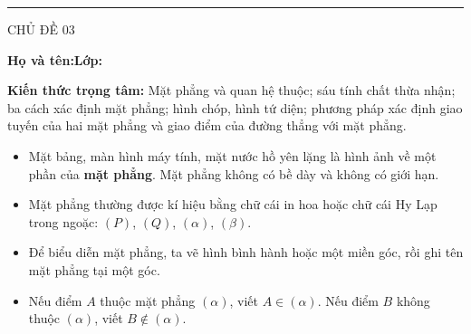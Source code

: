 \documentclass[11pt,a4paper]{article}
\newcommand{\sectitle}[2]{\vspace{4pt}\noindent{\large\bfseries\textcolor{questionpurple}{#1.\ #2}}\par\vspace{3pt}}
\begin{document}
\noindent
\begin{minipage}[t]{.35\linewidth}
 \vspace{2pt}\rule{.73\linewidth}{.4pt}\par\vspace{3pt}
 CHỦ ĐỀ 03\par\vspace{3pt}{\itshape TÀI LIỆU HỌC TẬP -- BÀI 07\par}
\end{minipage}\hfill
\begin{minipage}[t]{.62\linewidth}
 \vspace{4pt}{\small\bfseries VẤN ĐỀ 11X31\par
 CƠ BẢN VỀ HÌNH HỌC KHÔNG GIAN\par}
\end{minipage}

\vspace{4mm}
\noindent\textbf{Họ và tên:}\dotfill\hfill\textbf{Lớp:}\enspace\dotfill
\vspace{2mm}

\begin{theorybox}
\textbf{Kiến thức trọng tâm:} Mặt phẳng và quan hệ thuộc; sáu tính chất thừa nhận;
ba cách xác định mặt phẳng; hình chóp, hình tứ diện; phương pháp xác định
giao tuyến của hai mặt phẳng và giao điểm của đường thẳng với mặt phẳng.
\end{theorybox}

\sectitle{1}{Khái niệm mở đầu}
\begin{itemize}
 \item Mặt bảng, màn hình máy tính, mặt nước hồ yên lặng là hình ảnh về
 một phần của \textbf{mặt phẳng}. Mặt phẳng không có bề dày và không có giới hạn.
 \item Mặt phẳng thường được kí hiệu bằng chữ cái in hoa hoặc chữ cái Hy Lạp
 trong ngoặc: $(P)$, $(Q)$, $(\alpha)$, $(\beta)$.
 \item Để biểu diễn mặt phẳng, ta vẽ hình bình hành hoặc một miền góc,
 rồi ghi tên mặt phẳng tại một góc.
 \item Nếu điểm $A$ thuộc mặt phẳng $(\alpha)$, viết
 $\boxed{A\in(\alpha)}$. Nếu điểm $B$ không thuộc $(\alpha)$, viết
 $\boxed{B\notin(\alpha)}$.
\end{itemize}
\end{document}
